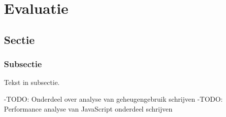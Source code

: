 \chapter{Evaluatie} \label{hoofdstuk:evaluatie}
\section{Sectie}
\subsection{Subsectie}
Tekst in subsectie.


-TODO: Onderdeel over analyse van geheugengebruik schrijven
-TODO: Performance analyse van JavaScript onderdeel schrijven